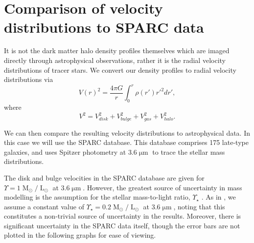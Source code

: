 \documentclass[a4paper,11pt]{article}
\begin{document}
\section{Comparison of velocity distributions to SPARC data}\label{sec:velocity}

It is not the dark matter halo density profiles themselves which are imaged directly through astrophysical observations, rather it is the radial velocity distributions of tracer stars. We convert our density profiles to radial velocity distributions \cite{Sofue:2008wt} via 
%
\begin{equation}
    V(r)^2 = \frac{4\pi G}{r}\int_0^r \rho(r')r'^2 dr',
\end{equation}
where 
\begin{equation}
    V^2 = V_{disk}^2 + V_{bulge}^2 + V_{gas}^2 + V_{halo}^2.
\end{equation}
%

We can then compare the resulting velocity distributions to astrophysical data. In this case we will use the SPARC database. This database comprises 175 late-type galaxies, and uses Spitzer photometry at $3.6\operatorname{\mu m}$ to trace the stellar mass distributions.

The disk and bulge velocities in the SPARC database are given for $\Upsilon = 1 \operatorname{M}_{\odot}/\operatorname{L}_{\odot}$ at $3.6\operatorname{\mu m}$. However, the greatest source of uncertainty in mass modelling is the assumption for the stellar mass-to-light ratio, $\Upsilon_\star$ \cite{Lelli:2016zqa}. As in \cite{Robles:2018fur}, we  assume a constant value of $\Upsilon_\star = 0.2 \operatorname{M}_{\odot}/\operatorname{L}_{\odot}$ at $3.6\operatorname{\mu m}$, noting that  this constitutes a non-trivial source of uncertainty in the results. Moreover, there is significant uncertainty in the SPARC data itself, though the error bars are not plotted in the following graphs for ease of viewing. 
\end{document}
